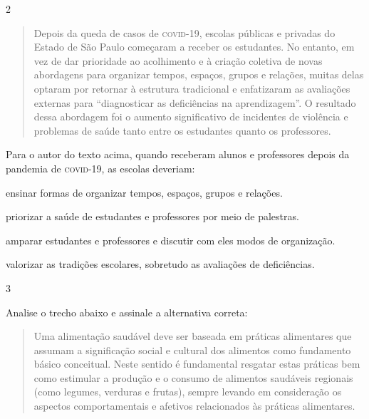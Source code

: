 \num{2}

\begin{quote}
Depois da queda de casos de \textsc{covid}-19, escolas públicas e privadas 
do Estado de São Paulo começaram a receber os estudantes. No entanto, em vez 
de dar prioridade ao acolhimento e à criação coletiva de novas abordagens para
organizar tempos, espaços, grupos e relações, muitas delas optaram por retornar 
à estrutura tradicional e enfatizaram as avaliações externas para ``diagnosticar 
as deficiências na aprendizagem''. O resultado dessa abordagem foi o aumento 
significativo de incidentes de violência e problemas de saúde tanto entre os
estudantes quanto os professores.
\end{quote}


Para o autor do texto acima, quando receberam alunos e professores depois da pandemia de 
\textsc{covid}-19, as escolas deveriam: 

\begin{escolha}

  \item ensinar formas de organizar tempos, espaços, grupos e relações.

  \item priorizar a saúde de estudantes e professores por meio de palestras.

  \item amparar estudantes e professores e discutir com eles modos de organização.

  \item valorizar as tradições escolares, sobretudo as avaliações de deficiências.  

\end{escolha}

\num{3}

Analise o trecho abaixo e assinale a alternativa correta:

\begin{quote}

Uma alimentação saudável deve ser baseada em práticas alimentares que
assumam a significação social e cultural dos alimentos como fundamento
básico conceitual. Neste sentido é fundamental resgatar estas práticas
bem como estimular a produção e o consumo de alimentos saudáveis
regionais (como legumes, verduras e frutas), sempre levando em
consideração os aspectos comportamentais e afetivos relacionados às
práticas alimentares.

\end{quote}

